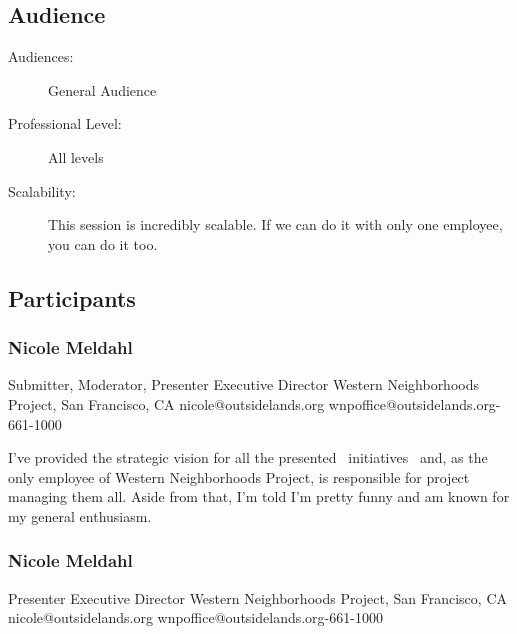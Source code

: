 \documentclass{report}
\begin{document}
              \subsection*{Audience}
                \begin{description}
                  \item [Audiences:]General Audience~
                  \item[Professional Level:]All levels~
                \item[Scalability:] This session is incredibly scalable. If we can do it with only one employee, you can do it too.

							
              \end{description}
            \subsection*{Participants}
              \subsubsection*{ Nicole Meldahl }
              Submitter, Moderator, Presenter\newline
              Executive Director\newline
              Western Neighborhoods Project, San Francisco, CA
              \newline
              nicole@outsidelands.org\newline
              wnpoffice@outsidelands.org-661-1000\newline

              I've provided the strategic vision for all the presented  initiatives  and, as the only employee of Western Neighborhoods Project, is responsible for project managing them all. Aside from that, I'm told I'm pretty funny and am known for my general enthusiasm.\newline


              

              
                \subsubsection*{ Nicole Meldahl }
                Presenter\newline
                Executive Director\newline
                Western Neighborhoods Project, San Francisco, CA
                \newline
                nicole@outsidelands.org\newline
                wnpoffice@outsidelands.org-661-1000\newline
\end{document}
